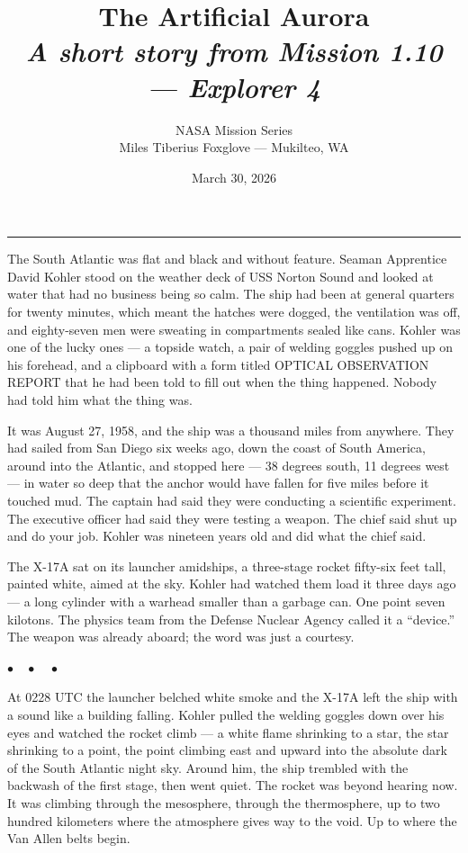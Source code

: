 \documentclass[12pt, letterpaper]{article}
\title{\Huge\textbf{The Artificial Aurora}\\[0.5em]\large\textit{A short story from Mission 1.10 --- Explorer 4}}
\author{NASA Mission Series\\[0.3em]\small Miles Tiberius Foxglove --- Mukilteo, WA}
\date{March 30, 2026}
\begin{document}
\maketitle
\thispagestyle{empty}

\vspace{1em}
\noindent\rule{\textwidth}{0.4pt}
\vspace{1em}

\noindent The South Atlantic was flat and black and without feature. Seaman Apprentice David Kohler stood on the weather deck of USS Norton Sound and looked at water that had no business being so calm. The ship had been at general quarters for twenty minutes, which meant the hatches were dogged, the ventilation was off, and eighty-seven men were sweating in compartments sealed like cans. Kohler was one of the lucky ones --- a topside watch, a pair of welding goggles pushed up on his forehead, and a clipboard with a form titled OPTICAL OBSERVATION REPORT that he had been told to fill out when the thing happened. Nobody had told him what the thing was.

It was August 27, 1958, and the ship was a thousand miles from anywhere. They had sailed from San Diego six weeks ago, down the coast of South America, around into the Atlantic, and stopped here --- 38 degrees south, 11 degrees west --- in water so deep that the anchor would have fallen for five miles before it touched mud. The captain had said they were conducting a scientific experiment. The executive officer had said they were testing a weapon. The chief said shut up and do your job. Kohler was nineteen years old and did what the chief said.

The X-17A sat on its launcher amidships, a three-stage rocket fifty-six feet tall, painted white, aimed at the sky. Kohler had watched them load it three days ago --- a long cylinder with a warhead smaller than a garbage can. One point seven kilotons. The physics team from the Defense Nuclear Agency called it a ``device.'' The weapon was already aboard; the word was just a courtesy.

\begin{center}
$\bullet\quad\bullet\quad\bullet$
\end{center}

At 0228 UTC the launcher belched white smoke and the X-17A left the ship with a sound like a building falling. Kohler pulled the welding goggles down over his eyes and watched the rocket climb --- a white flame shrinking to a star, the star shrinking to a point, the point climbing east and upward into the absolute dark of the South Atlantic night sky. Around him, the ship trembled with the backwash of the first stage, then went quiet. The rocket was beyond hearing now. It was climbing through the mesosphere, through the thermosphere, up to two hundred kilometers where the atmosphere gives way to the void. Up to where the Van Allen belts begin.
\end{document}
